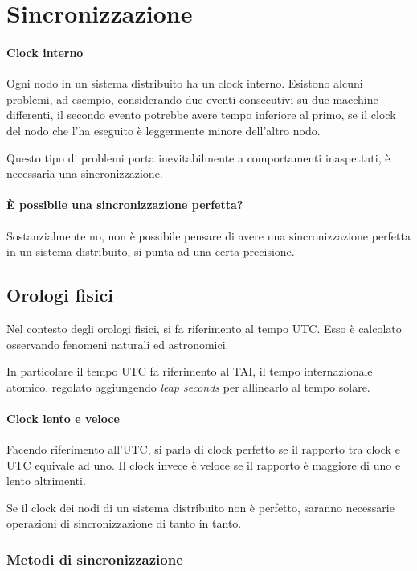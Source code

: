 \section{Sincronizzazione}

\paragraph{Clock interno}
Ogni nodo in un sistema distribuito ha un clock interno. 
Esistono alcuni problemi, ad esempio, considerando due eventi 
consecutivi su due macchine differenti, il secondo 
evento potrebbe avere tempo inferiore al primo, 
se il clock del nodo che l'ha eseguito è leggermente minore dell'altro nodo.

Questo tipo di problemi porta inevitabilmente a comportamenti 
inaspettati, è necessaria una sincronizzazione.
 
\paragraph{È possibile una sincronizzazione perfetta?}
Sostanzialmente no, non è possibile pensare di avere una 
sincronizzazione perfetta in un sistema distribuito, 
si punta ad una certa precisione.

\subsection{Orologi fisici}

Nel contesto degli orologi fisici, si fa riferimento al 
tempo UTC. Esso è calcolato osservando fenomeni naturali ed
astronomici.
 
In particolare il tempo UTC fa riferimento al 
TAI, il tempo internazionale atomico, regolato 
aggiungendo \emph{leap seconds} per allinearlo al tempo 
solare.

\paragraph{Clock lento e veloce}
Facendo riferimento all'UTC, si parla di clock perfetto 
se il rapporto tra clock e UTC equivale ad uno.
Il clock invece è veloce se il rapporto è maggiore 
di uno e lento altrimenti.

Se il clock dei nodi di un sistema distribuito non è perfetto, 
saranno necessarie operazioni di sincronizzazione di tanto 
in tanto.

\subsubsection{Metodi di sincronizzazione}

